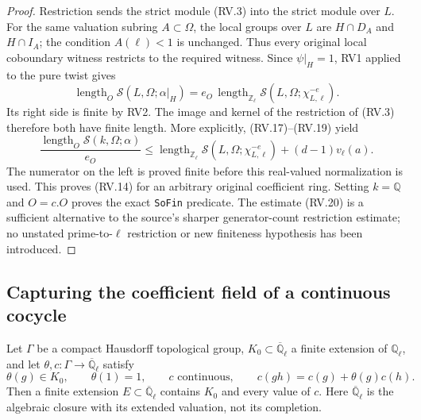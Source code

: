 \begin{proof}
Restriction sends the strict module (RV.3) into the strict module
over $L$.  For the same valuation subring $A\subset\Omega$, the
local groups over $L$ are $H\cap D_A$ and $H\cap I_A$; the
condition $A(\ell)<1$ is unchanged.  Thus every original local
coboundary witness restricts to the required witness.
Since $\psi|_H=1$, RV1 applied to the pure twist gives
\[
 \operatorname{length}_O\mathcal S(L,\Omega;\alpha|_H)
       =e_O\,
          \operatorname{length}_{\mathbb Z_\ell}
                  \mathcal S(L,\Omega;\chi_{L,\ell}^{-e}).
 \tag{RV.19}
\]
Its right side is finite by RV2.
The image and kernel of the restriction of (RV.3) therefore both
have finite length.  More explicitly, (RV.17)--(RV.19) yield
\[
 \frac{\operatorname{length}_O\mathcal S(k,\Omega;\alpha)}{e_O}
 \le
 \operatorname{length}_{\mathbb Z_\ell}
                  \mathcal S(L,\Omega;\chi_{L,\ell}^{-e})
                    +(d-1)v_\ell(a).
 \tag{RV.20}
\]
The numerator on the left is proved finite before this real-valued
normalization is used.
This proves (RV.14) for an arbitrary original coefficient ring.
Setting $k=\mathbb Q$ and $O=c.O$ proves the exact \texttt{SoFin}
predicate.  The estimate (RV.20) is a sufficient alternative to
the source's sharper generator-count restriction estimate; no
unstated prime-to-$\ell$ restriction or new finiteness hypothesis
has been introduced.
\end{proof}

\subsection{Capturing the coefficient field of a continuous cocycle}

\begin{proposition}
\label{claim:RV4}
Let $\Gamma$ be a compact Hausdorff topological group,
$K_0\subset\overline{\mathbb Q}_\ell$ a finite extension of
$\mathbb Q_\ell$, and let
$\theta,c:\Gamma\to\overline{\mathbb Q}_\ell$ satisfy
\[
 \theta(g)\in K_0,\qquad \theta(1)=1,\qquad
 c\text{ continuous},\qquad
 c(gh)=c(g)+\theta(g)c(h).
 \tag{RV.21}
\]
Then a finite extension $E\subset\overline{\mathbb Q}_\ell$
contains $K_0$ and every value of $c$.
Here $\overline{\mathbb Q}_\ell$ is the algebraic closure with
its extended valuation, not its completion.
\end{proposition}

